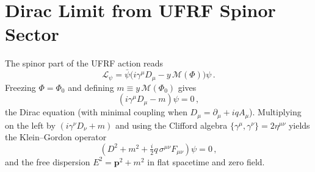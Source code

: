 
\section*{Dirac Limit from UFRF Spinor Sector}
The spinor part of the UFRF action reads
\begin{equation}
\mathcal{L}_\psi = \bar\psi\big(i\gamma^\mu D_\mu - y\,\mathcal{M}(\Phi)\big)\psi\,.
\end{equation}
Freezing $\Phi=\Phi_0$ and defining $m \equiv y\,\mathcal{M}(\Phi_0)$ gives
\begin{equation}
(i\gamma^\mu D_\mu - m)\psi = 0\,,
\end{equation}
the Dirac equation (with minimal coupling when $D_\mu=\partial_\mu + i q A_\mu$).
Multiplying on the left by $(i\gamma^\nu D_\nu + m)$ and using the Clifford algebra
$\{\gamma^\mu,\gamma^\nu\}=2\eta^{\mu\nu}$ yields the Klein--Gordon operator
\begin{equation}
\left(D^2 + m^2 + \tfrac{i}{2}q\,\sigma^{\mu\nu}F_{\mu\nu}\right)\psi=0\,,
\end{equation}
and the free dispersion $E^2=\mathbf{p}^2+m^2$ in flat spacetime and zero field.
